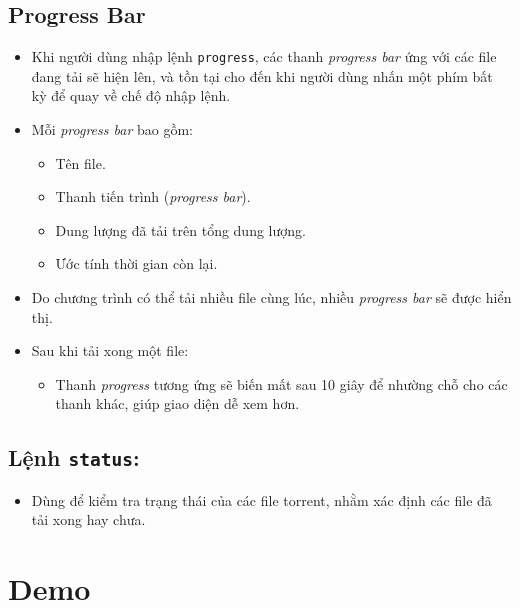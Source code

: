 \documentclass[a4paper]{article}
\begin{document}
\subsection{Progress Bar}
\begin{itemize}
    \item Khi người dùng nhập lệnh \texttt{progress}, các thanh \textit{progress bar} ứng với các file đang tải sẽ hiện lên, và tồn tại cho đến khi người dùng nhấn một phím bất kỳ để quay về chế độ nhập lệnh.
    \item Mỗi \textit{progress bar} bao gồm:
    \begin{itemize}
        \item Tên file.
        \item Thanh tiến trình (\textit{progress bar}).
        \item Dung lượng đã tải trên tổng dung lượng.
        \item Ước tính thời gian còn lại.
    \end{itemize}
    \item Do chương trình có thể tải nhiều file cùng lúc, nhiều \textit{progress bar} sẽ được hiển thị.
    \item Sau khi tải xong một file:
    \begin{itemize}
        \item Thanh \textit{progress} tương ứng sẽ biến mất sau 10 giây để nhường chỗ cho các thanh khác, giúp giao diện dễ xem hơn.
    \end{itemize}
\end{itemize}


\subsection{Lệnh \texttt{status}:}
\begin{itemize}
    \item Dùng để kiểm tra trạng thái của các file torrent, nhằm xác định các file đã tải xong hay chưa.
\end{itemize}


\section{Demo}
\end{document}
